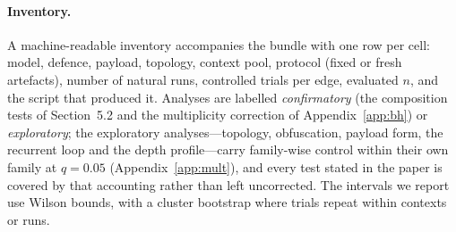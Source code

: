 \documentclass[sigconf,anonymous]{aamas}
\begin{document}
\paragraph{Inventory.} A machine-readable inventory accompanies the bundle with one
row per cell: model, defence, payload, topology, context pool, protocol
(fixed or fresh artefacts), number of natural runs, controlled trials per edge,
evaluated $n$, and the script that produced it. Analyses are labelled
\emph{confirmatory} (the composition tests of Section~5.2 and the multiplicity
correction of Appendix~\ref{app:bh}) or \emph{exploratory}; the exploratory
analyses---topology, obfuscation, payload form, the recurrent loop and the depth
profile---carry family-wise control within their own family at $q = 0.05$
(Appendix~\ref{app:mult}), and every test stated in the paper is covered by that
accounting rather than left uncorrected. The intervals we report use Wilson bounds,
with a cluster bootstrap where trials repeat within contexts or runs.



\end{document}
